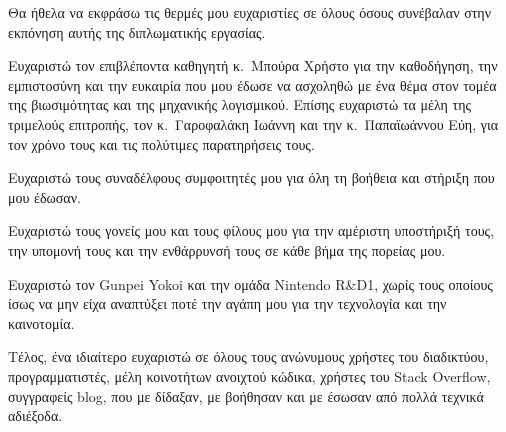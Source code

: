 \begin{acknowledgements}
Θα ήθελα να εκφράσω τις θερμές μου ευχαριστίες σε όλους όσους συνέβαλαν στην εκπόνηση αυτής της διπλωματικής εργασίας.

Ευχαριστώ τον επιβλέποντα καθηγητή κ.\ Μπούρα Χρήστο για την καθοδήγηση, την εμπιστοσύνη και την ευκαιρία που μου έδωσε να ασχοληθώ με ένα θέμα στον τομέα της βιωσιμότητας και της μηχανικής λογισμικού. Επίσης ευχαριστώ τα μέλη της τριμελούς επιτροπής, τον κ.\ Γαροφαλάκη Ιωάννη και την κ.\ Παπαϊωάννου Εύη, για τον χρόνο τους και τις πολύτιμες παρατηρήσεις τους.

Ευχαριστώ τους συναδέλφους συμφοιτητές μου για όλη τη βοήθεια και στήριξη που μου έδωσαν.

Ευχαριστώ τους γονείς μου και τους φίλους μου για την αμέριστη υποστήριξή τους, την υπομονή τους και την ενθάρρυνσή τους σε κάθε βήμα της πορείας μου.

Ευχαριστώ τον Gunpei Yokoi και την ομάδα Nintendo R\&D1, χωρίς τους οποίους ίσως να μην είχα αναπτύξει ποτέ την αγάπη μου για την τεχνολογία και την καινοτομία.

Τέλος, ένα ιδιαίτερο ευχαριστώ σε όλους τους ανώνυμους χρήστες του διαδικτύου, προγραμματιστές, μέλη κοινοτήτων ανοιχτού κώδικα, χρήστες του Stack Overflow, συγγραφείς blog, που με δίδαξαν, με βοήθησαν και με έσωσαν από πολλά τεχνικά αδιέξοδα.
\end{acknowledgements}
